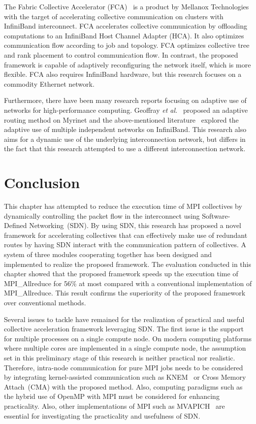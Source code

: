 The Fabric Collective Accelerator (FCA)~\autocite{fca} is a product by
Mellanox Technologies with the target of accelerating collective
communication on clusters with InfiniBand interconnect. FCA accelerates
collective communication by offloading computations to an InfiniBand
Host Channel Adapter (HCA). It also optimizes communication flow
according to job and topology. FCA optimizes collective tree and rank
placement to control communication flow. In contrast, the proposed
framework is capable of adaptively reconfiguring the network itself,
which is more flexible. FCA also requires InfiniBand hardware, but this
research focuses on a commodity Ethernet network.

Furthermore, there have been many research reports focusing on adaptive
use of networks for high-performance computing. Geoffray \emph{et
al.}~\autocite{Geoffray2008} proposed an adaptive routing method on Myrinet
and the above-mentioned literature~\autocite{Jiuxing2004} explored the
adaptive use of multiple independent networks on InfiniBand. This research also
aims for a dynamic use of the underlying interconnection network, but differs
in the fact that this research attempted to use a different interconnection
network.

\section{Conclusion}\label{sec:iii-conclusion}

This chapter has attempted to reduce the execution time of MPI
collectives by dynamically controlling the packet flow in the interconnect
using Software-Defined Networking~(SDN).
By using SDN, this research  has proposed a novel framework for accelerating
collectives that can effectively make use of redundant routes by having SDN
interact with the communication pattern of collectives. A system of three
modules cooperating together has been designed and implemented to realize the
proposed framework. The evaluation conducted in this chapter showed that the
proposed framework speeds up the execution time of MPI\_Allreduce for 56\% at
most compared with a conventional implementation of MPI\_Allreduce. This
result confirms the superiority of the proposed framework over conventional
methods.

Several issues to tackle have remained for the realization of practical
and useful collective acceleration framework leveraging SDN\@.
The first issue is the support for multiple processes on a single compute
node. On modern computing platforms where multiple cores are implemented in a
single compute node, the assumption set in this preliminary stage of this
research is neither practical nor realistic. Therefore, intra-node
communication for pure MPI jobs needs to be considered by integrating
kernel-assisted communication such as KNEM~\autocite{Goglin2013} or Cross
Memory Attach~(CMA) with the proposed method. Also, computing paradigms such
as the hybrid use of OpenMP with MPI must be considered for enhancing
practicality. Also, other implementations of MPI such as
MVAPICH~\autocite{mvapich} are essential for investigating the practicality
and usefulness of SDN\@.

